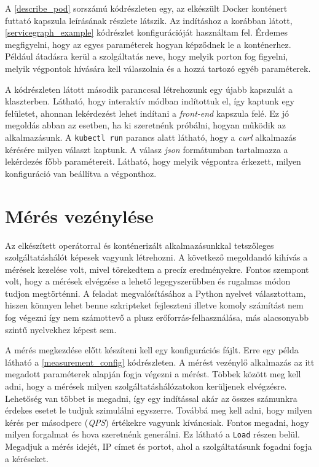 A \ref{describe_pod} sorszámú kódrészleten egy, az elkészült Docker konténert futtató kapszula leírásának részlete látszik. Az indításhoz a korábban látott, \ref{servicegraph_example} kódrészlet konfigurációját használtam fel. Érdemes megfigyelni, hogy az egyes  paraméterek hogyan képződnek le a konténerhez. Például átadásra kerül a szolgáltatás neve, hogy melyik porton fog figyelni, melyik végpontok hívására kell válaszolnia és a hozzá tartozó egyéb paraméterek.

A kódrészleten látott második paranccsal létrehozunk egy újabb kapszulát a klaszterben. Látható, hogy interaktív módban indítottuk el, így kaptunk egy felületet, ahonnan lekérdezést lehet indítani a \textit{front-end} kapszula felé. Ez jó megoldás abban az esetben, ha ki szeretnénk próbálni, hogyan működik az alkalmazásunk. A \verb+kubectl run+ parancs alatt látható, hogy a \textit{curl} alkalmazás kérésére milyen választ kaptunk. A válasz \textit{json} formátumban tartalmazza a lekérdezés főbb paramétereit. Látható, hogy melyik végpontra érkezett, milyen konfiguráció van beállítva a végponthoz.



\section{Mérés vezénylése}
\label{sec:measure_orchestrate}
Az elkészített operátorral és konténerizált alkalmazásunkkal tetszőleges szolgáltatáshálót képesek vagyunk létrehozni.
A következő megoldandó kihívás a mérések kezelése volt, mivel törekedtem a precíz eredményekre. 
Fontos szempont volt, hogy a mérések elvégzése a lehető legegyszerűbben és rugalmas módon tudjon megtörténni. 
A feladat megvalósításához a Python nyelvet választottam, hiszen könnyen lehet benne szkripteket fejleszteni illetve komoly számítást nem fog végezni így nem számottevő a plusz erőforrás-felhasználása, más alacsonyabb szintű nyelvekhez képest sem. 

A mérés megkezdése előtt készíteni kell egy konfigurációs fájlt. 
Erre egy példa látható a \ref{measurement_config} kódrészleten. 
A mérést vezénylő alkalmazás az itt megadott paraméterek alapján fogja végezni a mérést. 
Többek között meg kell adni, hogy a mérések milyen szolgáltatáshálózatokon kerüljenek elvégzésre. 
Lehetőség van többet is megadni, így egy indítással akár az összes számunkra érdekes esetet le tudjuk szimulálni egyszerre.
Továbbá meg kell adni, hogy milyen kérés per másodperc (\textit{QPS}) értékekre vagyunk kíváncsiak. 
Fontos megadni, hogy milyen forgalmat és hova szeretnénk generálni. 
Ez látható a \verb+Load+ részen belül. 
Megadjuk a mérés idejét, IP címet és portot, ahol a szolgáltatásunk fogadni fogja a kéréseket.\\

